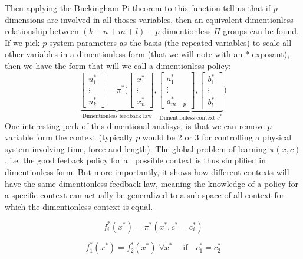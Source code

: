 Then applying the Buckingham Pi theorem to this function tell us that if $p$ dimensions are involved in all thoses variables, then an equivalent dimentionless relationship between $(k+n+m+l) - p$ dimentionless $\Pi$ groups can be found. If we pick $p$ system parameters as the basis (the repeated variables) to scale all other variables in a dimentionless form (that we will note with an $*$ exposant), then we have the form that will we call a dimentionless policy:
\begin{equation}
\underbrace{
\begin{bmatrix}
u_1^* \\
\vdots \\
u_k^*
\end{bmatrix}
=
\pi^* \Biggl(
\begin{bmatrix}
x_1^* \\
\vdots \\
x_n^*
\end{bmatrix}
}_{\text{Dimentionless feedback law}}
,
\underbrace{
\begin{bmatrix}
a_1^* \\
\vdots \\
a_{m-p}^*
\end{bmatrix}
,
\begin{bmatrix}
b_1^* \\
\vdots \\
b_l^*
\end{bmatrix}
}_{\text{Dimentionless context $c^*$}}
\Biggr)
\end{equation}
One interesting perk of this dimentional analisys, is that we can remove $p$ variable form the context (typically $p$ would be 2 or 3 for controlling a physical system involving time, force and length). The global problem of learning $\pi(x,c)$, i.e. the good feeback policy for all possible context is thus simplified in dimentionless form. But more importantly, it shows how different contexts will have the same dimentionless feedback law, meaning the knowledge of a policy for a specific context can actually be generalized to a sub-space of all context for which the dimentionless context is equal.

\begin{equation}
f_i^*(x^*) = \pi^*( x^* , c^* = c_i^*)
\end{equation}

\begin{equation}
f_1^*(x^*) = f_2^*(x^*) \; \forall x^* \; \quad \text{if} \quad c_1^* = c_2^*
\end{equation}

